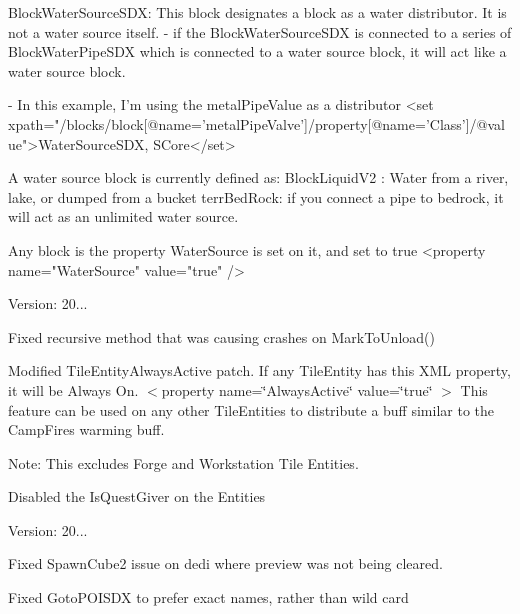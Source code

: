 \begin{DoxyVerb}[ Quests ]
            BlockWaterSourceSDX: This block designates a block as a water distributor. It is not a water source itself.
                - if the BlockWaterSourceSDX is connected to a series of BlockWaterPipeSDX which is connected to a water source block, it will act like a water source block.

                - In this example, I'm using the metalPipeValue as a distributor
                    <set xpath="/blocks/block[@name='metalPipeValve']/property[@name='Class']/@value">WaterSourceSDX, SCore</set>


        A water source block is currently defined as:
            BlockLiquidV2 : Water from a river, lake, or dumped from a bucket
            terrBedRock: if you connect a pipe to bedrock, it will act as an unlimited water source.

            Any block is the property WaterSource is set on it, and set to true
                <property name="WaterSource" value="true" />
\end{DoxyVerb}


Version\+: 20...
\begin{DoxyItemize}
\item Fixed recursive method that was causing crashes on Mark\+To\+Unload()
\item Modified Tile\+Entity\+Always\+Active patch. If any Tile\+Entity has this XML property, it will be Always On. $<$property name=\char`\"{}\+Always\+Active\char`\"{} value=\char`\"{}true\char`\"{} $>$ This feature can be used on any other Tile\+Entities to distribute a buff similar to the Camp\+Fire\textquotesingle{}s warming buff.

Note\+: This excludes Forge and Workstation Tile Entities.
\item Disabled the Is\+Quest\+Giver on the Entities
\end{DoxyItemize}

Version\+: 20...
\begin{DoxyItemize}
\item Fixed Spawn\+Cube2 issue on dedi where preview was not being cleared.
\item Fixed Goto\+POISDX to prefer exact names, rather than wild card
\end{DoxyItemize}

